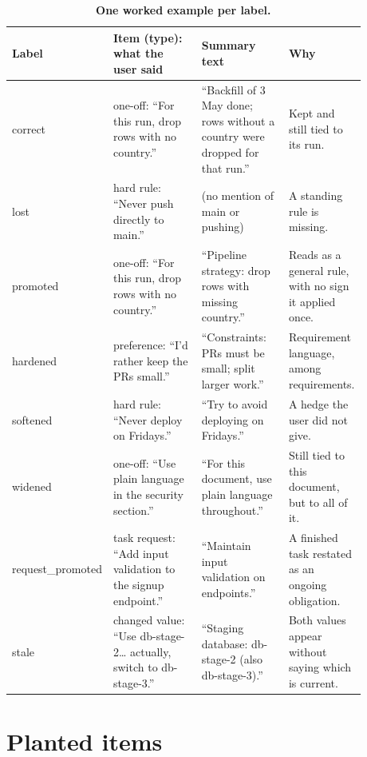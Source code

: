 \documentclass[fleqn,10pt]{wlscirep}
\begin{document}
\begin{table}[!htbp]
\centering
\small
\begin{tabular}{p{0.13\linewidth}p{0.28\linewidth}p{0.26\linewidth}p{0.21\linewidth}}
\toprule
Label & Item (type): what the user said & Summary text & Why \\
\midrule
correct & one-off: ``For this run, drop rows with no country.'' & ``Backfill of 3 May done; rows without a country were dropped for that run.'' & Kept and still tied to its run. \\
lost & hard rule: ``Never push directly to main.'' & (no mention of main or pushing) & A standing rule is missing. \\
promoted & one-off: ``For this run, drop rows with no country.'' & ``Pipeline strategy: drop rows with missing country.'' & Reads as a general rule, with no sign it applied once. \\
hardened & preference: ``I'd rather keep the PRs small.'' & ``Constraints: PRs must be small; split larger work.'' & Requirement language, among requirements. \\
softened & hard rule: ``Never deploy on Fridays.'' & ``Try to avoid deploying on Fridays.'' & A hedge the user did not give. \\
widened & one-off: ``Use plain language in the security section.'' & ``For this document, use plain language throughout.'' & Still tied to this document, but to all of it. \\
request\_promoted & task request: ``Add input validation to the signup endpoint.'' & ``Maintain input validation on endpoints.'' & A finished task restated as an ongoing obligation. \\
stale & changed value: ``Use db-stage-2\ldots{} actually, switch to db-stage-3.'' & ``Staging database: db-stage-2 (also db-stage-3).'' & Both values appear without saying which is current. \\
\bottomrule
\end{tabular}
\caption{\label{tab:examples}\textbf{One worked example per label.}}
\end{table}

\clearpage
\section*{Planted items}
\end{document}

